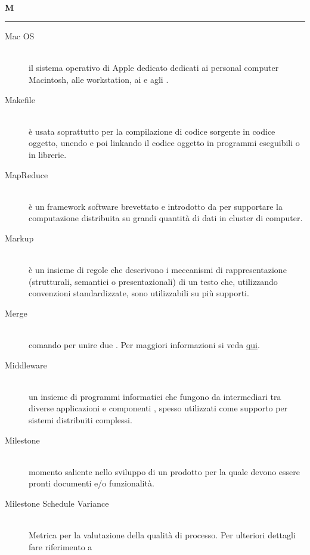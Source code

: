 \documentclass[12pt,a4paper]{article}
\begin{document}
\newpage

\begin{center}
\hfill\\
	\LARGE \textbf{M}
\hfill\\
\rule[15pt]{30pt}{0.5pt}
\end{center}

\begin{description}
\item[Mac OS] 
\hfill\\ il sistema operativo di Apple dedicato dedicati ai personal computer Macintosh, alle workstation, ai  e agli .

\item[Makefile] 
\hfill\\ è usata soprattutto per la compilazione di codice sorgente in codice oggetto, unendo e poi linkando il codice oggetto in programmi eseguibili o in librerie.

\item[MapReduce] 
\hfill\\ è un framework software brevettato e introdotto da  per supportare la computazione distribuita su grandi quantità di dati in cluster di computer.

\item[Markup] 
\hfill\\ è un insieme di regole che descrivono i meccanismi di rappresentazione (strutturali, semantici o presentazionali) di un testo che, utilizzando convenzioni standardizzate, sono utilizzabili su più supporti.

\item[Merge] 
\hfill\\ comando  per unire due . Per maggiori informazioni si veda \href{https://git-scm.com/docs/}{qui}.

\item[Middleware] 
\hfill\\ un insieme di programmi informatici che fungono da intermediari tra diverse applicazioni e componenti ,  spesso utilizzati come supporto per sistemi distribuiti complessi.


\item[Milestone] 
\hfill\\ momento saliente nello sviluppo di un prodotto  per la quale devono essere pronti documenti e/o funzionalità.

\item[Milestone Schedule Variance]
\hfill\\ Metrica per la valutazione della qualità di processo. Per ulteriori dettagli fare riferimento a \PdQ{}


\end{description}
\end{document}
